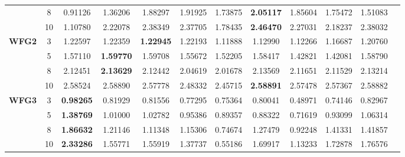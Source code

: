 \documentclass{sig-alternate}
\begin{document}
\begin{table}[!htb]
\begin{tabular}{|c|c|c|c|c|c|c|c|c|c|c|c|}
& 8          & 0.91126          & 1.36206           & 1.88297               & 1.91925          & 1.73875             & \textbf{2.05117}    & 1.85604            & 1.75472              & 1.51083          \\ \cline{2-11} 
& 10         & 1.10780          & 2.22078           & 2.38349               & 2.37705          & 1.78435             & \textbf{2.46470}    & 2.27031            & 2.18237              & 2.38032          \\ \hline
\multirow{4}{*}{\textbf{WFG2}}  & 3          & 1.22597          & 1.22359           & \textbf{1.22945}      & 1.22193          & 1.11888             & 1.12990             & 1.12266            & 1.16687              & 1.20760          \\ \cline{2-11} 
& 5          & 1.57110          & \textbf{1.59770}  & 1.59708               & 1.55672          & 1.52205             & 1.58417             & 1.42821            & 1.42081              & 1.58790          \\ \cline{2-11} 
& 8          & 2.12451          & \textbf{2.13629}  & 2.12442               & 2.04619          & 2.01678             & 2.13569             & 2.11651            & 2.11529              & 2.13214          \\ \cline{2-11} 
& 10         & 2.58524          & 2.58890           & 2.57778               & 2.48332          & 2.45715             & \textbf{2.58891}    & 2.57478            & 2.57367              & 2.58882          \\ \hline
\multirow{4}{*}{\textbf{WFG3}}  & 3          & \textbf{0.98265} & 0.81929           & 0.81556               & 0.77295          & 0.75364             & 0.80041             & 0.48971            & 0.74146              & 0.82967          \\ \cline{2-11} 
& 5          & \textbf{1.38769} & 1.01000           & 1.02782               & 0.95386          & 0.89357             & 0.88322             & 0.71619            & 0.93099              & 1.06314          \\ \cline{2-11} 
& 8          & \textbf{1.86632} & 1.21146           & 1.11348               & 1.15306          & 0.74674             & 1.27479             & 0.92248            & 1.41331              & 1.41857          \\ \cline{2-11} 
& 10         & \textbf{2.33286} & 1.55771           & 1.55919               & 1.37737          & 0.55186             & 1.69917             & 1.13233            & 1.72878              & 1.76576          \\ \hline

\end{tabular}
\end{table}
\end{document}
